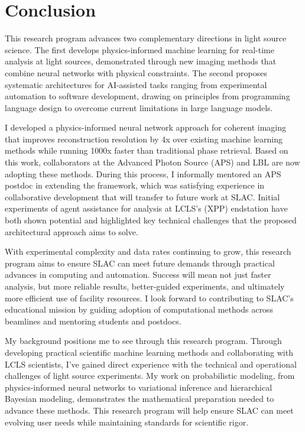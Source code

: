 \documentclass{article}
\begin{document}
\section{Conclusion}
This research program advances two complementary directions in light source science. The first develops physics-informed machine learning for real-time analysis at light sources, demonstrated through new imaging methods that combine neural networks with physical constraints. The second proposes systematic architectures for AI-assisted tasks ranging from experimental automation to software development, drawing on principles from programming language design to overcome current limitations in large language models.

I developed a physics-informed neural network approach for coherent imaging that improves reconstruction resolution by 4x over existing machine learning methods while running 1000x faster than traditional phase retrieval. Based on this work, collaborators at the Advanced Photon Source (APS) and LBL are now adopting these methods. During this process, I informally mentored an APS postdoc in extending the framework, which was satisfying experience in collaborative development that will transfer to future work at SLAC. Initial experiments of agent assistance for analysis at LCLS's (XPP) endstation have both shown potential and highlighted key technical challenges that the proposed architectural approach aims to solve.

With experimental complexity and data rates continuing to grow, this research program aims to ensure SLAC can meet future demands through practical advances in computing and automation. Success will mean not just faster analysis, but more reliable results, better-guided experiments, and ultimately more efficient use of facility resources. I look forward to contributing to SLAC's educational mission by guiding adoption of computational methods across beamlines and mentoring students and postdocs.

My background positions me to see through this research program. Through developing practical scientific machine learning methods and collaborating with LCLS scientists, I've gained direct experience with the technical and operational challenges of light source experiments. My work on probabilistic modeling, from physics-informed neural networks to variational inference and hierarchical Bayesian modeling, demonstrates the mathematical preparation needed to advance these methods. This research program will help ensure SLAC can meet evolving user needs while maintaining standards for scientific rigor.
\end{document}
